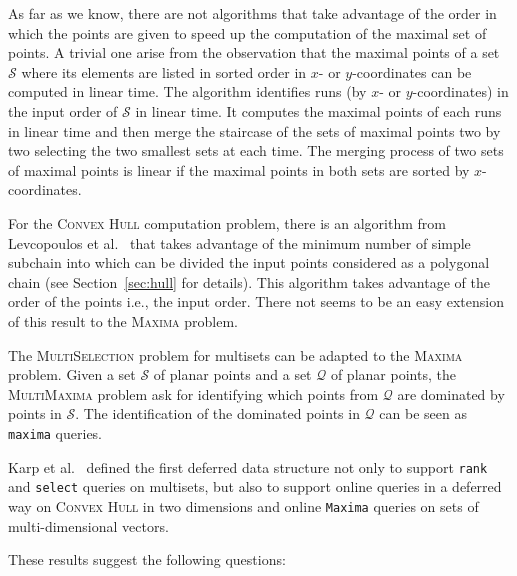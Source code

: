 
As far as we know, there are not algorithms that take advantage of the
order in which the points are given to speed up the computation of the
maximal set of points. A trivial one arise from the observation that
the maximal points of a set $\mathcal{S}$ where its elements are
listed in sorted order in $x$- or $y$-coordinates can be computed in
linear time. The algorithm identifies runs (by $x$- or
$y$-coordinates) in the input order of $\mathcal{S}$ in linear
time. It computes the maximal points of each runs in linear time and
then merge the staircase of the sets of maximal points two by two
selecting the two smallest sets at each time. The merging
process of two sets of maximal points is linear if the maximal points
in both sets are sorted by $x$-coordinates. 


For the \textsc{Convex Hull} computation problem, there is an algorithm
from Levcopoulos et
al.~\cite{2002-SWAT-AdaptiveAlgorithmsForConstructingConvexHullsAndTriangulationsOfPolygonalChains-LevcopoulosLingasMitchell}
that takes advantage of the minimum number of simple subchain into
which can be divided the input points considered as a polygonal chain
(see Section~\ref{sec:hull} for details). This algorithm takes
advantage of the order of the points i.e., the input order. There not
seems to be an easy extension of this result to the \textsc{Maxima}
problem.

The \textsc{MultiSelection} problem for multisets can be adapted to
the \textsc{Maxima} problem. Given a set $\mathcal{S}$ of planar
points and a set $\mathcal{Q}$ of planar points, the
\textsc{MultiMaxima} problem ask for identifying which points from
$\mathcal{Q}$ are dominated by points in $\mathcal{S}$. The
identification of the dominated points in $\mathcal{Q}$ can be seen as
\texttt{maxima} queries.

Karp et al.~\cite{1988-SIAM-DeferredDataStructuring-KarpMotwaniRaghavan}
defined the first deferred data structure not only to support
\texttt{rank} and \texttt{select} queries on multisets, but also to
support online queries in a deferred way on \textsc{Convex Hull} in
two dimensions and online \texttt{Maxima} queries on sets of
multi-dimensional vectors.


These results suggest the following questions:

